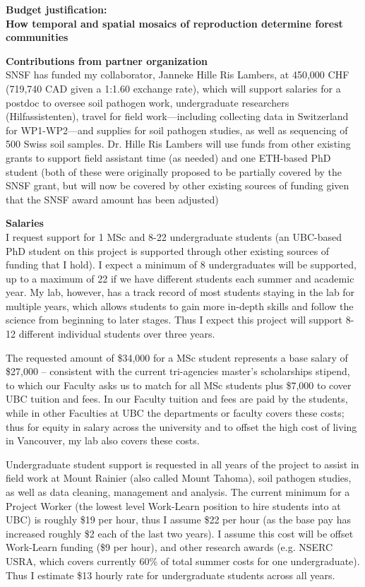 \documentclass[12pt,oneside]{article}
\begin{document}
% 
\renewcommand{\labelitemi}{$\textendash$}
\begin{center}
{\bf Budget justification: \\How temporal and spatial mosaics of reproduction determine forest communities}
\vspace{-0.5ex}
\end{center}
{\bf Contributions from partner organization}\\
SNSF has funded my collaborator, Janneke Hille Ris Lambers, at 450,000 CHF (719,740 CAD given a 1:1.60 exchange rate), which will support salaries for a postdoc to oversee soil pathogen work, undergraduate researchers (Hilfassistenten), travel for field work---including collecting data in Switzerland for WP1-WP2---and supplies for soil pathogen studies, as well as sequencing of 500 Swiss soil samples. Dr. Hille Ris Lambers will use funds from other existing grants to support field assistant time (as needed) and one ETH-based PhD student (both of these were originally proposed to be partially covered by the SNSF grant, but will now be covered by other existing sources of funding given that the SNSF award amount has been adjusted)

{\bf Salaries}\\
I request support for 1 MSc and 8-22 undergraduate students (an UBC-based PhD student on this project is supported through other existing sources of funding that I hold). I expect a minimum of 8  undergraduates will be supported, up to a maximum of 22 if we have different students each summer and academic year. My lab, however, has a track record of most students staying in the lab for multiple years, which allows students to gain more in-depth skills and follow the science from beginning to later stages. Thus I expect this project will support  8-12 different individual students over three years. 

The requested amount of \$34,000 for a MSc student represents a base salary of \$27,000 -- consistent with the current tri-agencies master’s scholarships stipend, to which our Faculty asks us to match for all MSc students plus \$7,000 to cover UBC tuition and fees. In our Faculty tuition and fees are paid by the students, while in other Faculties at UBC the departments or faculty covers these costs; thus for equity in salary across the university and to offset the high cost of living in Vancouver, my lab also covers these costs. 

Undergraduate student support is requested in all years of the project to assist in field work at Mount Rainier (also called Mount Tahoma), soil pathogen studies, as well as data cleaning, management and analysis. The current minimum for a Project Worker (the lowest level Work-Learn position to hire students into at UBC) is roughly \$19 per hour, thus I assume \$22 per hour (as the base pay has increased roughly \$2 each of the last two years). I assume this cost will be offset Work-Learn funding (\$9 per hour), and other research awards (e.g. NSERC USRA, which covers currently 60\% of total summer costs for one undergraduate). Thus I estimate \$13 hourly rate for undergraduate students across all years. 
\end{document}
